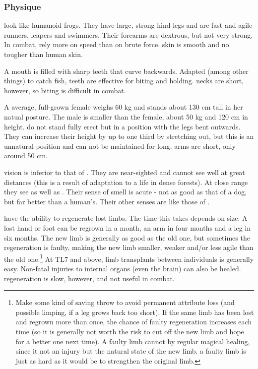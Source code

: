 \subsubsection{Physique}
\Meccara{} look like humanoid frogs. They have large, strong hind legs and are fast and agile runners, leapers and swimmers. Their forearms are dextrous, but not very strong. In combat, \meccarans{} rely more on speed than on brute force. \Meccaran{} skin is smooth and no tougher than human skin. 

A \meccaranz{} mouth is filled with sharp teeth that curve backwards. Adapted (among other things) to catch fish, \meccaran{} teeth are effective for biting and holding. \Meccaran{} necks are short, however, so biting is difficult in combat. 

A average, full-grown \meccaran{} female weighs 60 kg and stands about 130 cm tall in her natual posture. The male is smaller than the female, about 50 kg and 120 cm in height. \Meccarans{} do not stand fully erect but in a  position with the legs bent outwards. They can increase their height by up to one third by stretching out, but this is an unnatural position and can not be maintained for long. \Meccaran{} arms are short, only around 50 cm. 

\Meccaran{} vision is inferior to that of \humans. They are near-sighted and cannot see well at great distances (this is a result of adaptation to a life in dense forests). At close range they see as well as \humans. Their sense of smell is acute - not as good as that of a dog, but far better than a human's. Their other senses are like those of \humans. 

\Meccara{} have the ability to regenerate lost limbs. The time this takes depends on size: A lost hand or foot can be regrown in a month, an arm in four months and a leg in six months. The new limb is generally as good as the old one, but sometimes the regeneration is faulty, making the new limb smaller, weaker and/or less agile than the old one.\footnote{Make some kind of saving throw to avoid permanent attribute loss (and possible limping, if a leg grows back too short). If the same limb has been lost and regrown more than once, the chance of faulty regeneration increases each time (so it is generally not worth the risk to cut off the new limb and hope for a better one next time). A faulty limb cannot  by regular magical healing, since it not an injury but the natural state of the new limb.  a faulty limb is just as hard as it would be to strengthen the original limb.} At TL7 and above, limb transplants between individuals is generally easy. Non-fatal injuries to internal organs (even the brain) can also be healed. \Meccaran{} regeneration is slow, however, and not useful in combat. 

